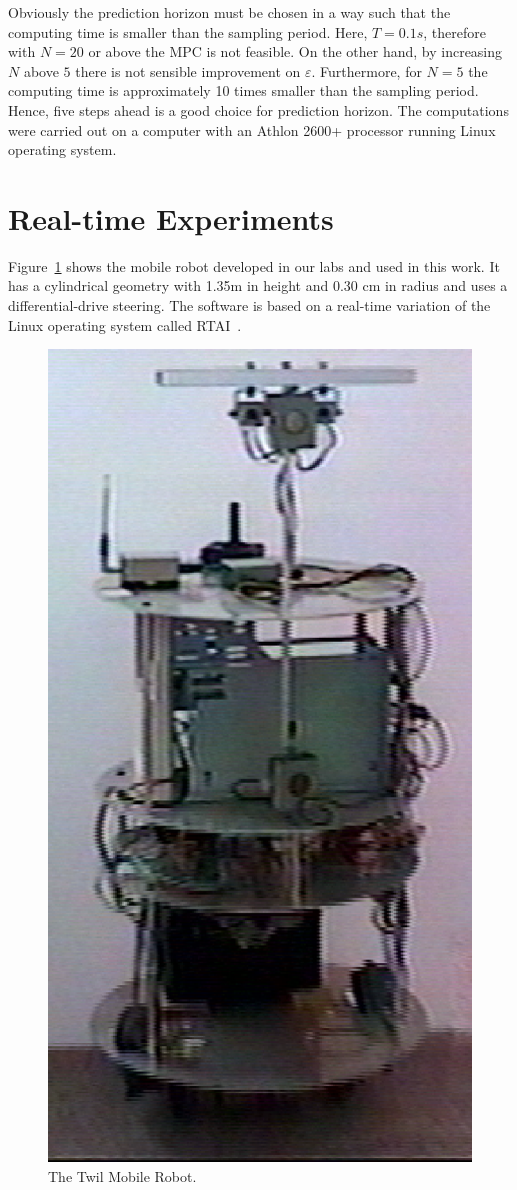 \documentclass[conference]{IEEEtran} %
\begin{document}
Obviously the prediction horizon must be chosen in a way such that the
computing time is smaller than the sampling period. Here, $T=0.1 s$,
therefore with $N=20$ or above the MPC is not feasible. On the other hand,
by increasing $N$ above $5$ there is not sensible improvement on
$\varepsilon$. Furthermore, for $N=5$ the computing time is approximately 10
times smaller than the sampling period. Hence, five steps ahead is a good
choice for prediction horizon. The computations were carried out on a
computer with an Athlon 2600+ processor running Linux operating system. 
 
\section{Real-time Experiments}
\label{sec:exp}

Figure~\ref{fig:twil} shows the mobile robot developed in our labs and used in
this work. It has a cylindrical geometry with 1.35m in height and 0.30 cm in
radius and uses a differential-drive steering. The software is based on a
real-time variation of the Linux operating system called
RTAI~\cite{Dozio:2003}.

\begin{figure}[htbp]
	\centering
	\includegraphics[width=0.65\linewidth]{Figures/twil6.ps}
	\caption{The Twil Mobile Robot.}
	\label{fig:twil}
\end{figure}
\end{document}
